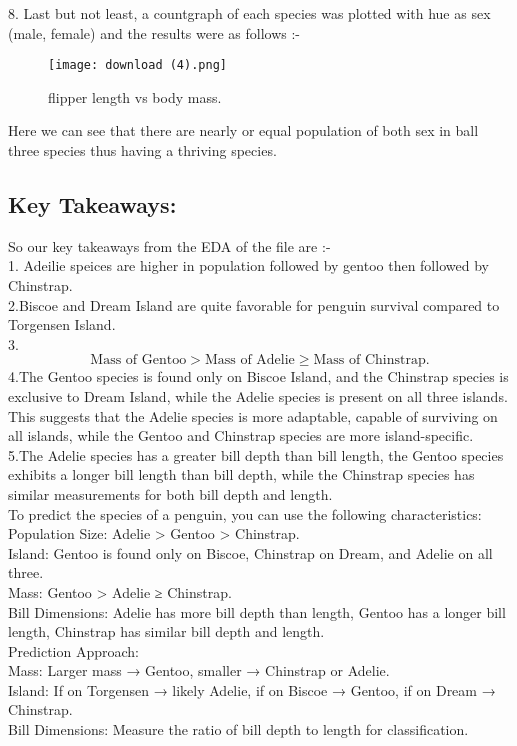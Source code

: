 \documentclass[12pt]{article}
\begin{document}
8. Last but not least, a countgraph of each species was plotted with hue as sex (male, female) and the results were as follows :-\\
\begin{figure}[H]
    \centering
    \texttt{[image: download (4).png]} 
    \caption{flipper length vs body mass.}
    \label{fig:example-image}
\end{figure}
Here we can see that there are nearly or equal population of both sex in ball three species thus having a thriving species.
\subsection{Key Takeaways: }
So our key takeaways from the EDA of the file  are :-\\
1. Adeilie speices  are higher in population followed by gentoo then followed by Chinstrap.\\
2.Biscoe and Dream Island are quite favorable for penguin survival compared to Torgensen Island.\\
3.\[
\text{Mass of Gentoo} > \text{Mass of Adelie} \geq \text{Mass of Chinstrap}.
\]
4.The Gentoo species is found only on Biscoe Island, and the Chinstrap species is exclusive to Dream Island, while the Adelie species is present on all three islands. This suggests that the Adelie species is more adaptable, capable of surviving on all islands, while the Gentoo and Chinstrap species are more island-specific.\\
5.The Adelie species has a greater bill depth than bill length, the Gentoo species exhibits a longer bill length than bill depth, while the Chinstrap species has similar measurements for both bill depth and length.\\
To predict the species of a penguin, you can use the following characteristics:\\

Population Size: Adelie > Gentoo > Chinstrap.\\
Island: Gentoo is found only on Biscoe, Chinstrap on Dream, and Adelie on all three.\\
Mass: Gentoo > Adelie ≥ Chinstrap.\\
Bill Dimensions: Adelie has more bill depth than length, Gentoo has a longer bill length, Chinstrap has similar bill depth and length.\\
Prediction Approach:\\
Mass: Larger mass → Gentoo, smaller → Chinstrap or Adelie.\\
Island: If on Torgensen → likely Adelie, if on Biscoe → Gentoo, if on Dream → Chinstrap.\\
Bill Dimensions: Measure the ratio of bill depth to length for classification.
\end{document}
